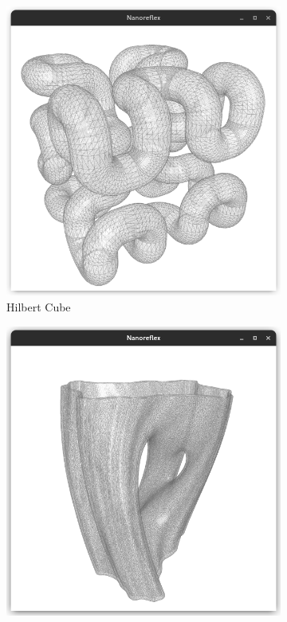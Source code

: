 \documentclass{stdlocal}
\begin{document}
\begin{figure}
\begin{subfigure}[b]{0.23\linewidth}
      \includegraphics[width=\linewidth,trim={25px 20 25 50},clip]{images/polyhedral-surface-hilbert-cube.png}
      \caption{Hilbert Cube}
    \end{subfigure}
    \hfill
    \begin{subfigure}[b]{0.23\linewidth}
      \centering
      \includegraphics[width=\linewidth,trim={25px 20 25 50},clip]{images/polyhedral-surface-julia-vase.png}

\end{subfigure}
\end{figure}
\end{document}
